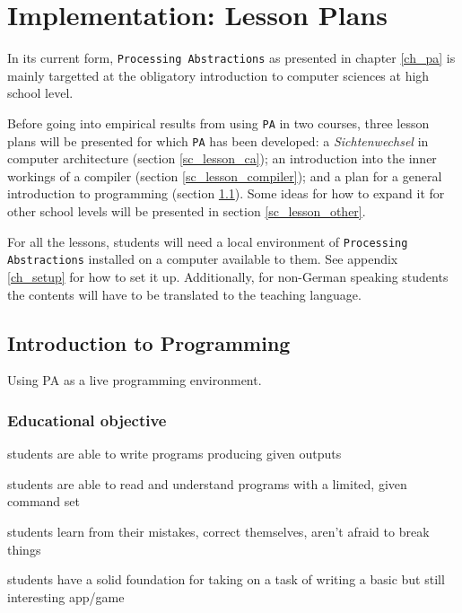 
\chapter{Implementation: Lesson Plans} \label{ch_teaching}
In its current form, \texttt{Processing Abstractions} as presented in chapter \ref{ch_pa} is mainly targetted at the obligatory introduction to computer sciences at high school level.

Before going into empirical results from using \texttt{PA} in two courses, three lesson plans will be presented for which \texttt{PA} has been developed: a \emph{Sichtenwechsel} in computer architecture (section \ref{sc_lesson_ca}); an introduction into the inner workings of a compiler (section \ref{sc_lesson_compiler}); and a plan for a general introduction to programming (section \ref{sc_lesson_intro}). Some ideas for how to expand it for other school levels will be presented in section \ref{sc_lesson_other}.

For all the lessons, students will need a local environment of \texttt{Processing Abstractions} installed on a computer available to them. See appendix \ref{ch_setup} for how to set it up. Additionally, for non-German speaking students the contents will have to be translated to the teaching language.

\section{Introduction to Programming} \label{sc_lesson_intro}
Using PA as a live programming environment.

\subsection{Educational objective}

\begin{todo}
\item students are able to write programs producing given outputs
\item students are able to read and understand programs with a limited, given command set
\item students learn from their mistakes, correct themselves, aren't afraid to break things
\item students have a solid foundation for taking on a task of writing a basic but still interesting app/game
\end{todo}

